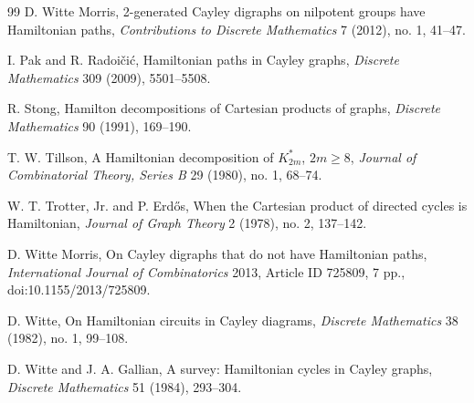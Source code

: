 \documentclass[11pt]{article}
\begin{document}
\begin{thebibliography}{99}
D. Witte Morris,
2-generated Cayley digraphs on nilpotent groups have Hamiltonian paths,
\emph{Contributions to Discrete Mathematics} 7 (2012), no. 1, 41--47.

I. Pak and R. Radoi\v{c}i\'{c},
Hamiltonian paths in Cayley graphs,
\emph{Discrete Mathematics} 309 (2009), 5501--5508.

R. Stong,
Hamilton decompositions of Cartesian products of graphs,
\emph{Discrete Mathematics} 90 (1991), 169--190.

T. W. Tillson,
A Hamiltonian decomposition of \(K_{2m}^{*}\), \(2m\ge8\),
\emph{Journal of Combinatorial Theory, Series B} 29 (1980), no. 1, 68--74.

W. T. Trotter, Jr. and P. Erd\H{o}s,
When the Cartesian product of directed cycles is Hamiltonian,
\emph{Journal of Graph Theory} 2 (1978), no. 2, 137--142.

D. Witte Morris,
On Cayley digraphs that do not have Hamiltonian paths,
\emph{International Journal of Combinatorics} 2013, Article ID 725809, 7 pp., doi:10.1155/2013/725809.

D. Witte,
On Hamiltonian circuits in Cayley diagrams,
\emph{Discrete Mathematics} 38 (1982), no. 1, 99--108.

D. Witte and J. A. Gallian,
A survey: Hamiltonian cycles in Cayley graphs,
\emph{Discrete Mathematics} 51 (1984), 293--304.

\end{thebibliography}
\end{document}
